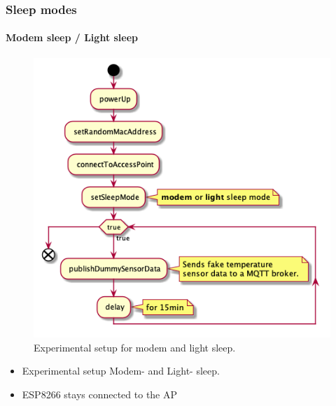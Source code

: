 \begin{frame}
    \frametitle{Sleep modes}
    \framesubtitle{Modem sleep / Light sleep}

    \begin{minipage}{0.45 \textwidth}
        \begin{figure}[H]
            \centering
            \includegraphics[width = 1 \linewidth]{../paper/fig/sequence_modem_light_sleep.png}
            \caption{Experimental setup for modem and light sleep.}
            \label{fig:experiment_modem_light_sleep}
        \end{figure}
    \end{minipage}
    \begin{minipage}{0.45 \textwidth}
        \begin{itemize}
            \item Experimental setup Modem- and Light- sleep.
            \item ESP8266 stays connected to the AP
        \end{itemize}
    \end{minipage}
\end{frame}



